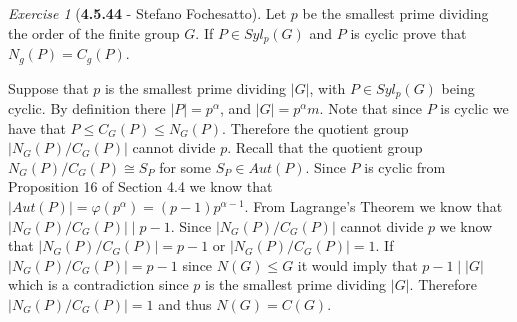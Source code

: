 \documentclass[12pt]{amsart}
\makeatletter
\theoremstyle{remark}
\newtheorem*{exercise}{Exercise}%
\renewenvironment{proof}[1][\proofname]{\par\doublespacing
  \pushQED{\qed}%
  \normalfont \topsep6\p@\@plus6\p@\relax
  \list{}{%
    \settowidth{\leftmargin}{\itshape\proofname:\hskip\labelsep}%
    \setlength{\labelwidth}{0pt}%
    \setlength{\itemindent}{-\leftmargin}%
  }%
  \item[\hskip\labelsep\itshape#1\@addpunct{:}]\ignorespaces
}{%
  \popQED\endlist\@endpefalse
  \singlespacing
}
\theoremstyle{mycomment}
\makeatother
\begin{document}
\begin{exercise}[\textbf{4.5.44} - Stefano Fochesatto] Let $p$ be the smallest prime dividing 
  the order of the finite group $G$. If $P \in Syl_p(G)$ and $P$ is cyclic prove that 
  $N_g(P) = C_g(P)$. 
  \begin{proof} Suppose that $p$ is the smallest prime dividing $|G|$, with $P \in Syl_p(G)$ 
    being cyclic. By definition there $|P| = p^{\alpha}$, and $|G| = p^{\alpha}m$. Note that 
    since $P$ is cyclic we have that $P \leq C_G(P)\leq N_G(P)$. Therefore the quotient group 
    $|N_G(P)/C_G(P)|$ cannot divide $p$. Recall that the quotient group $N_G(P)/C_G(P) \cong S_{P}$ for some $S_{P} \in Aut(P)$. Since $P$ is cyclic from Proposition 16 of 
    Section 4.4 we know that $|Aut(P)| = \varphi(p^{\alpha}) = (p-1)p^{\alpha - 1}$. From Lagrange's Theorem we know that $|N_G(P)/C_G(P)|\mid p - 1$. 
    Since $|N_G(P)/C_G(P)|$ cannot divide $p$ we know that $|N_G(P)/C_G(P)| = p - 1$ or $|N_G(P)/C_G(P)| = 1$. If $|N_G(P)/C_G(P)| = p - 1$ since $N(G) \leq G$ it would 
    imply that $p - 1 \mid |G|$ which is a contradiction since $p$ is the smallest prime dividing $|G|$. Therefore $|N_G(P)/C_G(P)| = 1$ and thus $N(G) = C(G)$.
  \end{proof}

\end{exercise}
\vspace{.15in}










  
\end{document}
